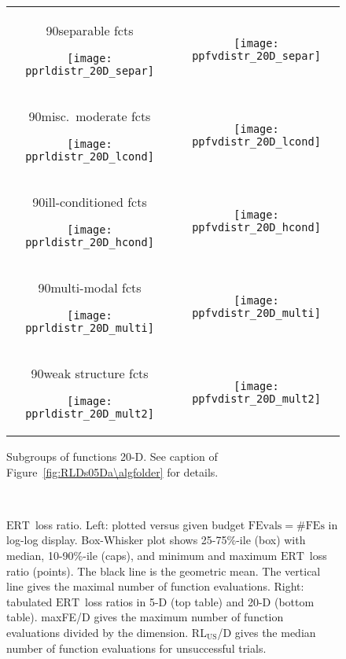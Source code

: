 \documentclass{article}
\newcommand{\bbobdatapath}{ppdata/} %
\newcommand{\ERT}{\ensuremath{\mathrm{ERT}}}
\newcommand{\FEvals}{\ensuremath{\mathrm{FEvals}}}
\newcommand{\nbFEs}{\ensuremath{\mathrm{\#FEs}}}
\newcommand{\rot}[2][2.5]{
  \hspace*{-3.5\baselineskip}%
  \begin{rotate}{90}\hspace{#1em}#2
  \end{rotate}}
\begin{document}
\begin{figure}[htbp!]
\centering
\begin{tabular}{@{}c@{}c@{}}
\rot[2.5]{separable fcts}
\texttt{[image: pprldistr\_20D\_separ]} &
\texttt{[image: ppfvdistr\_20D\_separ]}
\\[-1ex]
\rot[1.3]{misc.\ moderate fcts}
\texttt{[image: pprldistr\_20D\_lcond]} &
\texttt{[image: ppfvdistr\_20D\_lcond]}
\\[-1ex]
\rot[1.1]{ill-conditioned fcts}
\texttt{[image: pprldistr\_20D\_hcond]} &
\texttt{[image: ppfvdistr\_20D\_hcond]}
\\[-1ex]
\rot[1.7]{multi-modal fcts}
\texttt{[image: pprldistr\_20D\_multi]} &
\texttt{[image: ppfvdistr\_20D\_multi]}
\\[-1ex]
\rot[1.5]{weak structure fcts}
\texttt{[image: pprldistr\_20D\_mult2]} &
\texttt{[image: ppfvdistr\_20D\_mult2]}
\end{tabular}
\vspace*{-0.5ex}
\caption{\label{fig:RLDs20Db\algfolder}Subgroups of functions 20-D. See caption
of Figure~\ref{fig:RLDs05Da\algfolder} for details.}
\end{figure}
\begin{figure}[htbp!]
\subfloat{
\centering
\scriptsize
}\\[-2ex]
\subfloat{
\centering
\scriptsize
}
\caption{\label{fig:ERTloglossa\algfolder}
\ERT\ loss ratio. Left: plotted versus given budget
$\FEvals=\nbFEs$ in log-log display. Box-Whisker plot shows 25-75\%-ile (box)
with median, 10-90\%-ile (caps), and minimum and maximum \ERT\ loss ratio
(points). The black line is the geometric mean. The vertical line gives the
maximal number of function evaluations. Right: tabulated \ERT\ loss ratios
in 5-D (top table) and 20-D (bottom table). maxFE/D gives the maximum number of
function evaluations divided by the dimension. RL$_{\text{US}}$/D gives the
median number of function evaluations for unsuccessful trials.}
\end{figure}
\end{document}
